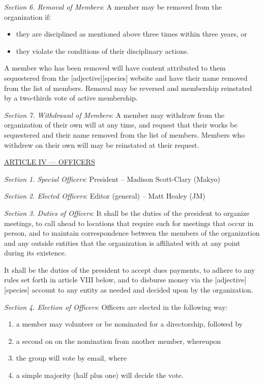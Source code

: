 \documentclass{article}
\begin{document}
\emph{Section 6. Removal of Members}: A member may be removed from the organization if:
\begin{itemize}
  \item they are disciplined as mentioned above three times within three years, or
  \item they violate the conditions of their disciplinary actions.
\end{itemize}

A member who has been removed will have content attributed to them sequestered from the [adjective][species] website and have their name removed from the list of members.  Removal may be reversed and membership reinstated by a two-thirds vote of active membership.

\emph{Section 7. Withdrawal of Members}: A member may withdraw from the organization of their own will at any time, and request that their works be sequestered and their name removed from the list of members.  Members who withdrew on their own will may be reinstated at their request.

\bigskip

\large{\underline{ARTICLE IV --- OFFICERS}}

\emph{Section 1. Special Officers}: President -- Madison Scott-Clary (Makyo)

\emph{Section 2. Elected Officers}: Editor (general) -- Matt Healey (JM)

\emph{Section 3. Duties of Officers}: It shall be the duties of the president to organize meetings, to call ahead to locations that require such for meetings that occur in person, and to maintain correspondence between the members of the organization and any outside entities that the organization is affiliated with at any point during its existence.

It shall be the duties of the president to accept dues payments, to adhere to any rules set forth in article VIII below, and to disburse money via the [adjective][species] account to any entity as needed and decided upon by the organization.

\emph{Section 4. Election of Officers}: Officers are elected in the following way:
\begin{enumerate}
  \item a member may volunteer or be nominated for a directorship, followed by
  \item a second on on the nomination from another member, whereupon
  \item the group will vote by email, where
  \item a simple majority (half plus one) will decide the vote.
\end{enumerate}
\end{document}
